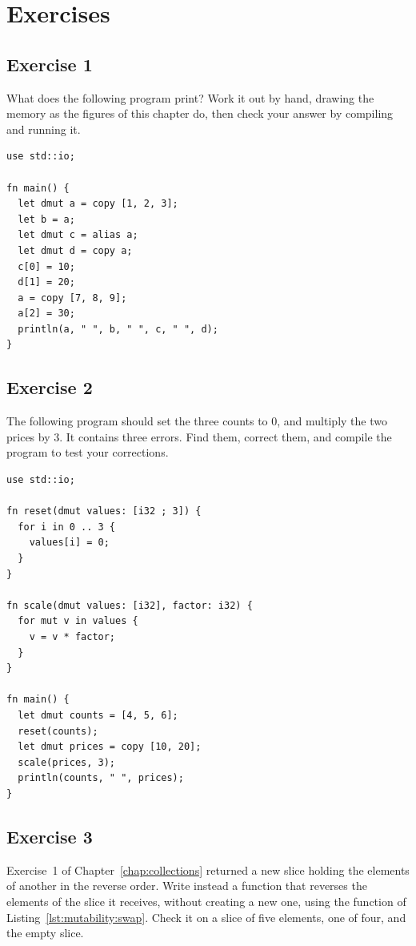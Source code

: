 \vfill%
\pagebreak

\section*{Exercises}
%
\subsection*{Exercise 1}

What does the following program print? Work it out by hand, drawing the memory
as the figures of this chapter do, then check your answer by compiling and
running it.

\begin{lstlisting}[style=coloredverbatim]
use std::io;

fn main() {
  let dmut a = copy [1, 2, 3];
  let b = a;
  let dmut c = alias a;
  let dmut d = copy a;
  c[0] = 10;
  d[1] = 20;
  a = copy [7, 8, 9];
  a[2] = 30;
  println(a, " ", b, " ", c, " ", d);
}
\end{lstlisting}

\subsection*{Exercise 2}

The following program should set the three counts to 0, and multiply the two
prices by 3. It contains three errors. Find them, correct them, and compile the
program to test your corrections.

\begin{lstlisting}[style=coloredverbatimError, caption=Ymir program with errors]
use std::io;

fn reset(dmut values: [i32 ; 3]) {
  for i in 0 .. 3 {
    values[i] = 0;
  }
}

fn scale(dmut values: [i32], factor: i32) {
  for mut v in values {
    v = v * factor;
  }
}

fn main() {
  let dmut counts = [4, 5, 6];
  reset(counts);
  let dmut prices = copy [10, 20];
  scale(prices, 3);
  println(counts, " ", prices);
}
\end{lstlisting}

\subsection*{Exercise 3}

Exercise~1 of Chapter~\ref{chap:collections} returned a new slice holding the
elements of another in the reverse order. Write instead a function
 that reverses the elements of the
slice it receives, without creating a new one, using the function 
of Listing~\ref{lst:mutability:swap}. Check it on a slice of five elements, one
of four, and the empty slice.

